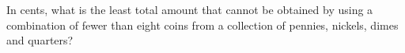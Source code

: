 In cents, what is the least total amount that cannot be obtained by using a combination of fewer than eight coins from a collection of pennies, nickels, dimes and quarters?
